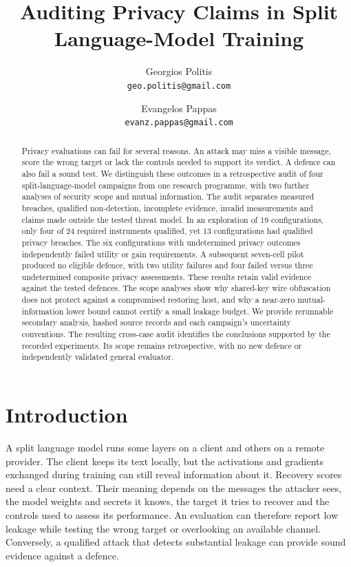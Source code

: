 \documentclass[11pt]{article}
\title{\textbf{Auditing Privacy Claims in Split Language-Model Training}}
\author{Georgios Politis\\ {\small\texttt{geo.politis@gmail.com}} \and
Evangelos Pappas\\ {\small\texttt{evanz.pappas@gmail.com}}}
\date{}
\begin{document}
\maketitle
\begin{abstract}
Privacy evaluations can fail for several reasons. An attack may miss a
visible message, score the wrong target or lack the controls needed to
support its verdict. A defence can also fail a sound test. We distinguish
these outcomes in a retrospective audit of four split-language-model
campaigns from one research programme, with two further analyses of
security scope and mutual information. The audit separates measured
breaches, qualified non-detection, incomplete evidence, invalid
measurements and claims made outside the tested threat model. In an
exploration of 19 configurations, only four of 24 required instruments
qualified, yet 13 configurations had qualified privacy breaches.
The six configurations with undetermined privacy outcomes independently
failed utility or gain requirements. A subsequent seven-cell pilot
produced no eligible defence, with two utility failures and four failed
versus three undetermined composite privacy assessments. These results
retain valid evidence against the tested defences. The scope analyses
show why shared-key wire obfuscation does not protect against a
compromised restoring host, and why a near-zero mutual-information lower
bound cannot certify a small leakage budget. We provide rerunnable
secondary analysis, hashed source records and each campaign's uncertainty
conventions. The resulting cross-case audit identifies the conclusions
supported by the recorded experiments. Its scope remains retrospective,
with no new defence or independently validated general evaluator.
\end{abstract}

\section{Introduction}
\label{sec:intro}

A split language model runs some layers on a client and others on a
remote provider. The client keeps its text locally, but the activations
and gradients exchanged during training can still reveal information
about it. Recovery scores need a clear context. Their meaning depends on
the messages the attacker sees, the model weights and secrets it knows,
the target it tries to recover and the controls used to assess its
performance. An evaluation can therefore report low leakage while testing
the wrong target or overlooking an available channel. Conversely, a
qualified attack that detects substantial leakage can provide sound
evidence against a defence.
\end{document}
